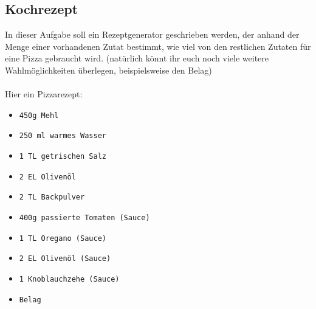 \subsection{Kochrezept}
In dieser Aufgabe soll ein Rezeptgenerator geschrieben werden, der anhand der Menge einer vorhandenen Zutat bestimmt, wie viel von den restlichen Zutaten für eine Pizza gebraucht wird. (natürlich könnt ihr euch noch viele weitere Wahlmöglichkeiten überlegen, beispielsweise den Belag) \\
\\
Hier ein Pizzarezept: \\
\begin{multicols}{2}
	\begin{itemize}
	    \item \texttt{450g Mehl}
	    \item \texttt{250 ml warmes Wasser}
	    \item \texttt{1 TL getrischen Salz}
	    \item \texttt{2 EL Olivenöl}
	    \item \texttt{2 TL Backpulver}
	    \item \texttt{400g passierte Tomaten (Sauce)}
	    \item \texttt{1 TL Oregano (Sauce)}
	    \item \texttt{2 EL Olivenöl (Sauce)}
	    \item \texttt{1 Knoblauchzehe (Sauce)}
	    \item \texttt{Belag}
	\end{itemize}
\end{multicols}